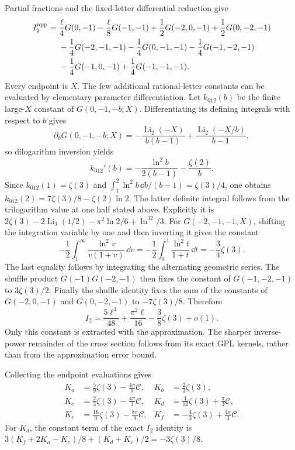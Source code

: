 Partial fractions and the fixed-letter differential reduction give
\begin{equation}
\begin{aligned}
 I_2^{\rm app}={}&\frac\ell4G(0,-1)-\frac\ell8G(-1,-1)
 +\frac12G(-2,0,-1)+\frac12G(0,-2,-1)\\
 &-\frac14G(-2,-1,-1)-\frac14G(0,-1,-1)
 -\frac14G(-1,-2,-1)\\
 &-\frac14G(-1,0,-1)+\frac14G(-1,-1,-1).
\end{aligned}
\end{equation}
Every endpoint is $X$. The few additional rational-letter constants
can be evaluated by elementary parameter differentiation. Let
$k_{012}(b)$ be the finite large-$X$ constant of $G(0,-1,-b;X)$.
Differentiating its defining integrals with respect to $b$ gives
\begin{equation}
 \partial_bG(0,-1,-b;X)
 =-\frac{\operatorname{Li}_2(-X)}{b(b-1)}
       +\frac{\operatorname{Li}_2(-X/b)}{b-1},
\end{equation}
so dilogarithm inversion yields
\begin{equation}
 k_{012}'(b)=-\frac{\ln^2b}{2(b-1)}-\frac{\zeta(2)}b.
\end{equation}
Since $k_{012}(1)=\zeta(3)$ and
$\int_1^2\ln^2b\,\dd b/(b-1)=\zeta(3)/4$, one obtains
$k_{012}(2)=7\zeta(3)/8-\zeta(2)\ln2$. The latter definite
integral follows from the trilogarithm value at one half stated above.
Explicitly it is
$2\zeta(3)-2\operatorname{Li}_3(1/2)-\pi^2\ln2/6+\ln^32/3$.
For $G(-2,-1,-1;X)$, shifting the integration variable by one and
then inverting it gives the constant
\begin{equation}
 -\frac12\int_1^\infty\frac{\ln^2v}{v(1+v)}\,\dd v
 =-\frac12\int_0^1\frac{\ln^2t}{1+t}\,\dd t
 =-\frac34\zeta(3).
\end{equation}
The last equality follows by integrating the alternating geometric
series. The shuffle product $G(-1)G(-2,-1)$ then fixes the constant
of $G(-1,-2,-1)$ to $3\zeta(3)/2$. Finally the shuffle identity
fixes the sum of the constants of $G(-2,0,-1)$ and $G(0,-2,-1)$
to $-7\zeta(3)/8$. Therefore
\begin{equation}
 I_2=\frac{5\ell^3}{48}+\frac{\pi^2\ell}{16}
                         -\frac38\zeta(3)+o(1).
\end{equation}
Only this constant is extracted with the approximation. The sharper
inverse-power remainder of the cross section follows from its exact
GPL kernels, rather than from the approximation error bound.

Collecting the endpoint evaluations gives
\begin{align}
 K_a&=\frac59\zeta(3)-\frac{4\pi}{9}\mathcal C,&
 K_b&=\frac23\zeta(3),\\
 K_c&=\frac23\zeta(3)-\frac{4\pi}{3}\mathcal C,&
 K_d&=\frac1{12}\zeta(3)+\frac\pi3\mathcal C,\\
 K_e&=\frac{16}{9}\zeta(3)-\frac{8\pi}{9}\mathcal C,&
 K_f&=-\frac43\zeta(3)+\frac{4\pi}{3}\mathcal C.
 \label{eq:comp-high-root-constants}
\end{align}
For $K_d$, the constant term of the exact $I_2$ identity is
$3(K_f+2K_a-K_e)/8+(K_d+K_c)/2=-3\zeta(3)/8$.
